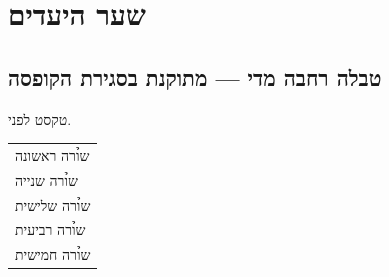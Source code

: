 %
%


\chapter{שער היעדים}

\section{טבלה רחבה מדי — מתוקנת בסגירת הקופסה}
טקסט לפני.

\begin{tablebox}\centering\small
\begin{tabular}{@{}p{\dimexpr\linewidth+3pt\relax}@{}}
\toprule
\h{שורה ראשונה} \\
\h{שורה שנייה} \\
\h{שורה שלישית} \\
\h{שורה רביעית} \\
\h{שורה חמישית} \\
\bottomrule
\end{tabular}
\end{tablebox}

